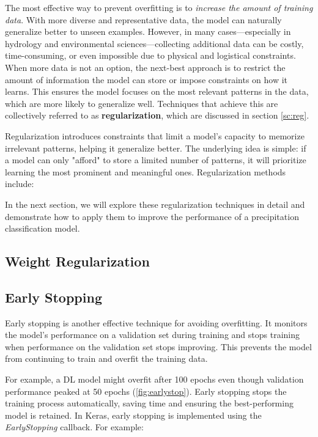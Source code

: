 The most effective way to prevent overfitting is to \textit{increase the amount of training data}. With more diverse and representative data, the model can naturally generalize better to unseen examples. However, in many cases—especially in hydrology and environmental sciences—collecting additional data can be costly, time-consuming, or even impossible due to physical and logistical constraints.
When more data is not an option, the next-best approach is to restrict the amount of information the model can store or impose constraints on how it learns. This ensures the model focuses on the most relevant patterns in the data, which are more likely to generalize well. Techniques that achieve this are collectively referred to as \textbf{regularization}, which are discussed in section \ref{sc:reg}.


Regularization introduces constraints that limit a model's capacity to memorize irrelevant patterns, helping it generalize better. The underlying idea is simple: if a model can only "afford" to store a limited number of patterns, it will prioritize learning the most prominent and meaningful ones. Regularization methods include:


In the next section, we will explore these regularization techniques in detail and demonstrate how to apply them to improve the performance of a precipitation classification model.







\subsection{Weight Regularization}
\subsection{Early Stopping}
Early stopping is another effective technique for avoiding overfitting. It monitors the model’s performance on a validation set during training and stops training when performance on the validation set stops improving. This prevents the model from continuing to train and overfit the training data.

For example, a DL model might overfit after 100 epochs even though validation performance peaked at 50 epochs (\ref{fig:earlystop}). Early stopping stops the training process automatically, saving time and ensuring the best-performing model is retained.
In Keras, early stopping is implemented using the \textit{EarlyStopping} callback. For example:


